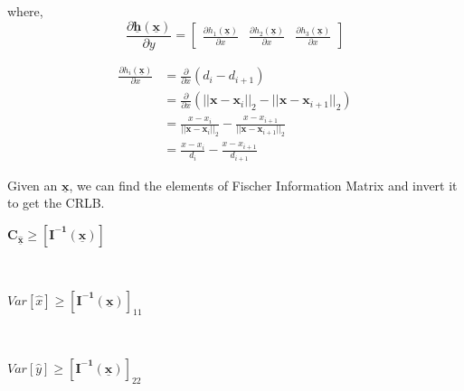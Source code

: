 \documentclass[a4 paper]{article}
\begin{document}
where,
\[
\frac{\partial \mathbf{\underline{h}(\mathbf{\underline{x}})}}{\partial y} 
= 
\begin{bmatrix}
\frac{\partial h_{1}(\mathbf{\underline{x}})}{\partial x} & \frac{\partial h_{2}(\mathbf{\underline{x}})}{\partial x} & \frac{\partial h_{3}(\mathbf{\underline{x}})}{\partial x}
\end{bmatrix}
\]

\begin{align*}
\frac{\partial h_{i}(\mathbf{\underline{x}})}{\partial x} &= \frac{\partial}{\partial x} (d_{i} - d_{i+1})
\\ &= \frac{\partial}{\partial x}(||\mathbf{x}-\mathbf{x}_{i}||_{2} - ||\mathbf{x}-\mathbf{x}_{i+1}||_{2} )
\\ &= \frac{x- x_{i}}{||\mathbf{x}-\mathbf{x}_{i}||_{2}} - \frac{x- x_{i+1}}{||\mathbf{x}-\mathbf{x}_{i+1}||_{2}}
\\ &= \frac{x- x_{i}}{d_{i}} - \frac{x- x_{i+1}}{d_{i+1}}
\end{align*}

\newpage
Given an $\mathbf{\underline{x}}$, we can find the elements of Fischer Information Matrix and invert it to get the CRLB.
\\ \centerline{$ \mathbf{C}_{\mathbf{\hat{\underline{x}}}} \geq [\mathbf{I^{-1}(\mathbf{\underline{x}})}] $}
\\ \centerline{$ Var[{\hat{x}}] \geq [\mathbf{I^{-1}(\mathbf{\underline{x}})}]_{11} $}
\\ \centerline{$ Var[{\hat{y}}] \geq [\mathbf{I^{-1}(\mathbf{\underline{x}})}]_{22} $}
\end{document}
